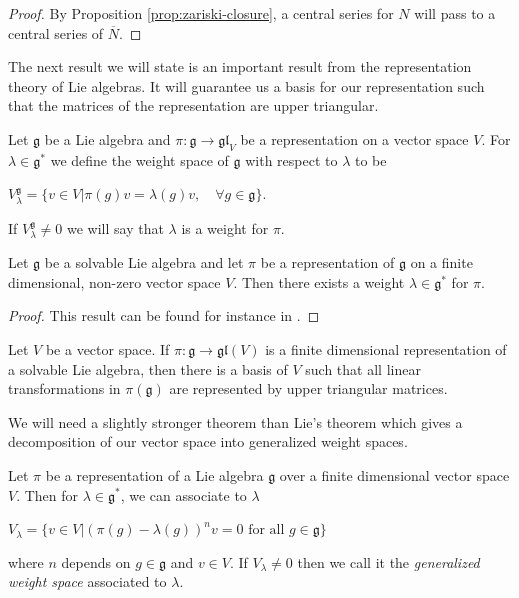\begin{proof}
    By Proposition \ref{prop:zariski-closure}, a central series for $N$ will pass to a central series of $\overline{N}$.
\end{proof}

The next result we will state is an important result from the representation
theory of Lie algebras. It will guarantee us a basis for our representation
such that the matrices of the representation are upper triangular.

\begin{definition}
    Let $\mathfrak{g}$ be a Lie algebra and $\pi: \mathfrak{g} \to \mathfrak{gl}_V$ be a representation on a vector space $V$. For $\lambda \in \mathfrak{g}^*$
    we define the weight space of $\mathfrak{g}$ with respect to $\lambda$ to be
    \begin{center}
        $V_{\lambda}^{\mathfrak{g}} = \{v \in V | \pi(g)v = \lambda(g)v ,\quad \forall g \in \mathfrak{g}\}$.
    \end{center}
\end{definition}

\begin{remark}
    If $V_{\lambda}^{\mathfrak{g}} \neq 0$ we will say that $\lambda$ is a weight for $\pi$.
\end{remark}

\begin{lemma}
    Let $\mathfrak{g}$ be a solvable Lie algebra and let $\pi$ be a representation of $\mathfrak{g}$ on a finite
    dimensional, non-zero vector space $V$. Then there exists
    a weight  $\lambda \in \mathfrak{g}^*$ for $\pi$.
\end{lemma}
\begin{proof}
    This result can be found for instance in \cite{kac2010lietheorem}.
\end{proof}

\begin{corollary}
    Let $V$ be a vector space. If $\pi : \mathfrak{g} \to \mathfrak{gl}(V)$
    is a finite dimensional representation of a solvable Lie algebra, then there is a basis of $V$ such that all linear transformations in
    $\pi(\mathfrak{g})$ are represented by upper triangular matrices.
\end{corollary}
We will need a slightly stronger theorem than Lie's theorem which gives a decomposition of our vector space
into generalized weight spaces.

\begin{definition}
    Let $\pi$ be a representation of a Lie algebra $\mathfrak{g}$ over a finite dimensional vector space $V$. Then
    for $\lambda \in \mathfrak{g}^*$, we can associate to $\lambda$
    \begin{center}
        $V_{\lambda} = \{v \in V | (\pi(g) - \lambda(g))^nv =0 \text{ for all } g\in \mathfrak{g}\}$
    \end{center}
    where $n$ depends on $g \in \mathfrak{g}$ and $v \in V$. If $V_{\lambda} \neq 0$ then we call it
    the \textit{generalized weight space} associated to $\lambda$.
\end{definition}

